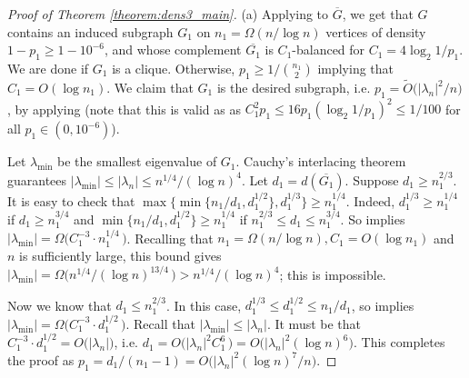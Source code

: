 \documentclass[11pt]{article}
\theoremstyle{plain}
\theoremstyle{definition}
\begin{document}
\begin{proof}[Proof of Theorem \ref{theorem:dens3_main}]
(a) 
    Applying  to $\overline{G}$, we get that $G$ contains an induced subgraph $G_1$ on $n_1 = \Omega(n/\log n)$ vertices of density $1-p_1\geq 1-10^{-6}$, and whose complement $\overline{G_1}$ is $C_1$-balanced for $C_1=4\log_2 1/p_1$.
    We are done if $G_1$ is a clique.
    Otherwise, $p_1\geq 1/\binom{n_1}{2}$ implying that $C_1 = O(\log n_1)$. 
    We claim that $G_1$ is the desired subgraph, i.e. $p_1 = \widetilde{O}\big(|\lambda_n|^2/n\big)$, by applying  (note that this is valid as as $C_1^2p_1\le 16p_1(\log_2 1/p_1)^2 \le 1/100$ for all $p_1\in (0, 10^{-6})$).

    Let $\lambda_{\min}$ be the smallest eigenvalue of $G_1$. 
    Cauchy's interlacing theorem guarantees $|\lambda_{\min}| \le |\lambda_n|\leq n^{1/4}/(\log n)^4$. 
    Let $d_1 = d(\overline{G_1})$.
    Suppose $d_1 \ge n_1^{2/3}$.
    It is easy to check that $\max\big\{\min\{n_1/d_1, d_1^{1/2}\}, d_1^{1/3}\big\} \ge n_1^{1/4}$.
    Indeed, $d_1^{1/3} \ge n_1^{1/4}$ if $d_1 \ge n_1^{3/4}$ and $\min\{n_1/d_1, d_1^{1/2}\} \ge n_1^{1/4}$ if $n_1^{2/3} \le d_1 \le n_1^{3/4}$.
    So  implies $|\lambda_{\min}| = \Omega\big(C_1^{-3}\cdot n_1^{1/4}\,\big)$.
    Recalling that $n_1 = \Omega(n/\log n), C_1=O(\log n_1)$ and $n$ is sufficiently large, this bound gives $|\lambda_{\min}|=\Omega(n^{1/4}/(\log n)^{13/4}\,\big) > n^{1/4}/(\log n)^4$; this is impossible.

    Now we know that $d_1 \le n_1^{2/3}$.
    In this case, $d_1^{1/3} \le d_1^{1/2} \le n_1/d_1$, so  implies $|\lambda_{\min}| = \Omega\big(C_1^{-3}\cdot d_1^{1/2}\,\big)$.
    Recall that $|\lambda_{\min}| \le |\lambda_n|$.
    It must be that $C_1^{-3}\cdot d_1^{1/2} = O\big(|\lambda_n|\big)$, i.e. $d_1 = O\big(|\lambda_n|^2 C_1^{6}\,\big) = O\big(|\lambda_n|^2 (\log n)^6\big)$.
    This completes the proof as $p_1 = d_1/(n_1-1) = O\big(|\lambda_n|^2 (\log n)^7/n\big)$.

\end{proof}
\end{document}
